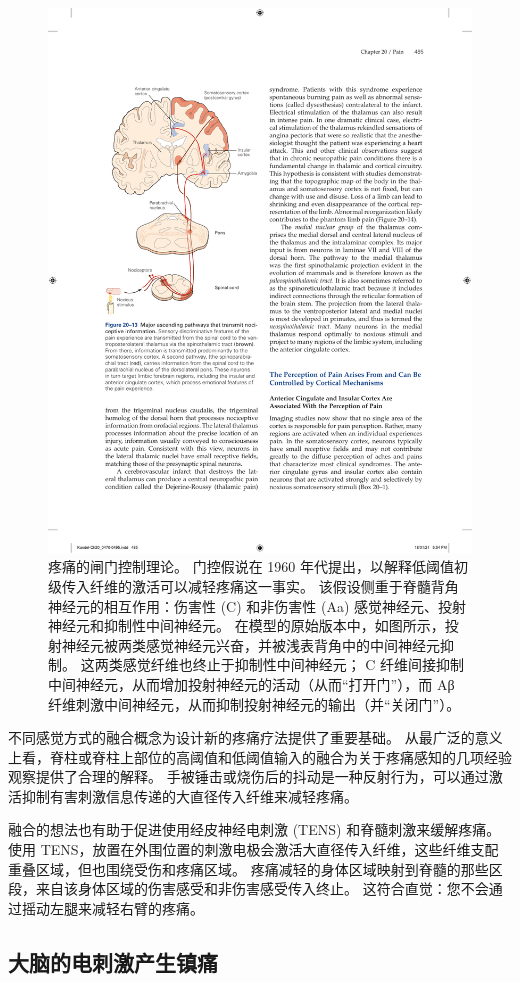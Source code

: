 \begin{figure}[htbp]
	\centering
	\includegraphics[width=0.7\linewidth]{chap20/fig_20_13}
	\caption{疼痛的闸门控制理论。
		门控假说在 1960 年代提出，以解释低阈值初级传入纤维的激活可以减轻疼痛这一事实。 该假设侧重于脊髓背角神经元的相互作用：伤害性 (C) 和非伤害性 (Aa) 感觉神经元、投射神经元和抑制性中间神经元。
		在模型的原始版本中，如图所示，投射神经元被两类感觉神经元兴奋，并被浅表背角中的中间神经元抑制。 
		这两类感觉纤维也终止于抑制性中间神经元； C 纤维间接抑制中间神经元，从而增加投射神经元的活动（从而“打开门”），而 Aβ 纤维刺激中间神经元，从而抑制投射神经元的输出（并“关闭门”）。}
	\label{fig:20_16}
\end{figure}


不同感觉方式的融合概念为设计新的疼痛疗法提供了重要基础。
从最广泛的意义上看，脊柱或脊柱上部位的高阈值和低阈值输入的融合为关于疼痛感知的几项经验观察提供了合理的解释。
手被锤击或烧伤后的抖动是一种反射行为，可以通过激活抑制有害刺激信息传递的大直径传入纤维来减轻疼痛。


融合的想法也有助于促进使用经皮神经电刺激 (TENS) 和脊髓刺激来缓解疼痛。
使用 TENS，放置在外围位置的刺激电极会激活大直径传入纤维，这些纤维支配重叠区域，但也围绕受伤和疼痛区域。
疼痛减轻的身体区域映射到脊髓的那些区段，来自该身体区域的伤害感受和非伤害感受传入终止。
这符合直觉：您不会通过摇动左腿来减轻右臂的疼痛。



\subsection{大脑的电刺激产生镇痛}

